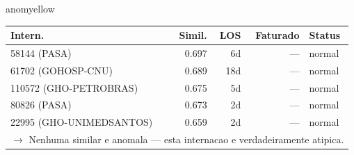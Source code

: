\documentclass[a4paper,10pt]{article}
\begin{document}
\begin{anomalycard}[Internacao 6200 | GHO-PETROBRAS | MODERADO (z=2.40)]{anomyellow}
\begin{tabular}{l r r r l}\toprule\textbf{Intern.} & \textbf{Simil.} & \textbf{LOS} & \textbf{Faturado} & \textbf{Status} \\\midrule
58144 (PASA) & 0.697 & 6d & --- & \textcolor{jcubeblue}{normal} \\
61702 (GOHOSP-CNU) & 0.689 & 18d & --- & \textcolor{jcubeblue}{normal} \\
110572 (GHO-PETROBRAS) & 0.675 & 5d & --- & \textcolor{jcubeblue}{normal} \\
80826 (PASA) & 0.673 & 2d & --- & \textcolor{jcubeblue}{normal} \\
22995 (GHO-UNIMEDSANTOS) & 0.659 & 2d & --- & \textcolor{jcubeblue}{normal} \\
\multicolumn{5}{l}{\textcolor{jcubeblue}{\small $\rightarrow$ Nenhuma similar e anomala --- esta internacao e verdadeiramente atipica.}} \\
\bottomrule\end{tabular}


\end{anomalycard}

\newpage
\end{document}
